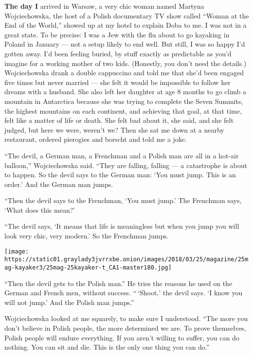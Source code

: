 \textbf{The day I} arrived in Warsaw, a very chic woman named Martyna
Wojciechowska, the host of a Polish documentary TV show called ``Woman
at the End of the World,'' showed up at my hotel to explain Doba to me.
I was not in a great state. To be precise: I was a Jew with the flu
about to go kayaking in Poland in January --- not a setup likely to end
well. But still, I was so happy I'd gotten away. I'd been feeling
buried, by stuff exactly as predictable as you'd imagine for a working
mother of two kids. (Honestly, you don't need the details.)
Wojciechowska drank a double cappuccino and told me that she'd been
engaged five times but never married --- she felt it would be impossible
to follow her dreams with a husband. She also left her daughter at age 8
months to go climb a mountain in Antarctica because she was trying to
complete the Seven Summits, the highest mountains on each continent, and
achieving that goal, at that time, felt like a matter of life or death.
She felt bad about it, she said, and she felt judged, but here we were,
weren't we? Then she sat me down at a nearby restaurant, ordered
pierogies and borscht and told me a joke.

``The devil, a German man, a Frenchman and a Polish man are all in a
hot-air balloon,'' Wojciechowska said. ``They are falling, falling --- a
catastrophe is about to happen. So the devil says to the German man:
`You must jump. This is an order.' And the German man jumps.

``Then the devil says to the Frenchman, `You must jump.' The Frenchman
says, `What does this mean?'

``The devil says, `It means that life is meaningless but when you jump
you will look very chic, very modern.' So the Frenchman jumps.

\texttt{[image: https://static01.graylady3jvrrxbe.onion/images/2018/03/25/magazine/25mag-kayaker3/25mag-25kayaker-t\_CA1-master180.jpg]}

``Then the devil gets to the Polish man.'' He tries the reasons he used
on the German and French men, without success. `` `Shoot,' the devil
says. `I know you will not jump.' And the Polish man jumps.''

Wojciechowska looked at me squarely, to make sure I understood. ``The
more you don't believe in Polish people, the more determined we are. To
prove themselves, Polish people will endure everything. If you aren't
willing to suffer, you can do nothing. You can sit and die. This is the
only one thing you can do.''

